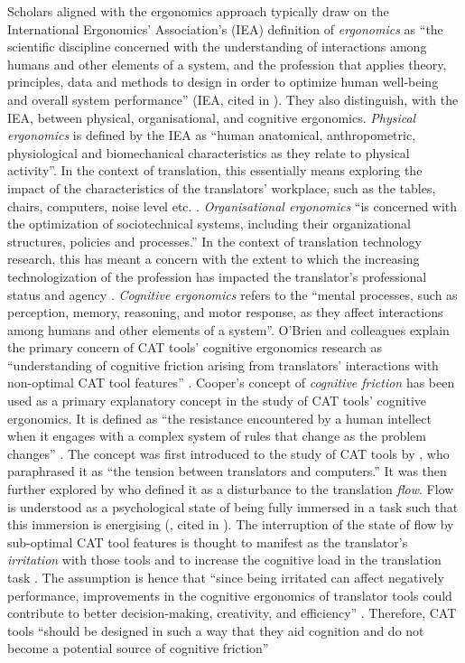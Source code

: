 Scholars aligned with the ergonomics approach typically draw on the International Ergonomics’ Association’s (IEA) definition of \textit{ergonomics} as ``the scientific discipline concerned with the understanding of interactions among humans and other elements of a system, and the profession that applies theory, principles, data and methods to design in order to optimize human well-being and overall system performance'' (IEA, cited in \cite{ehrensberger2019ergonomics}). They also distinguish, with the IEA, between physical, organisational, and cognitive ergonomics. \textit{Physical ergonomics} is defined by the IEA as ``human anatomical, anthropometric, physiological and biomechanical characteristics as they relate to physical activity''. In the context of translation, this essentially means exploring the impact of the characteristics of the translators’ workplace, such as the tables, chairs, computers, noise level etc. \citep[38]{ehrensberger2019ergonomics}. \textit{Organisational ergonomics} ``is concerned with the optimization of sociotechnical systems, including their organizational structures, policies and processes.'' In the context of translation technology research, this has meant a concern with the extent to which the increasing technologization of the profession has impacted the translator’s professional status and agency \citep[39]{ehrensberger2019ergonomics}. \textit{Cognitive ergonomics} refers to the ``mental processes, such as perception, memory, reasoning, and motor response, as they affect interactions among humans and other elements of a system''. O’Brien and colleagues explain the primary concern of CAT tools’ cognitive ergonomics research as ``understanding of cognitive friction arising from translators’ interactions with non-optimal CAT tool features'' \citep[147]{o2017irritating}. Cooper’s concept of \textit{cognitive friction} \citep{cooper2004high} has been used as a primary explanatory concept in the study of CAT tools’ cognitive ergonomics. It is defined as ``the resistance encountered by a human intellect when it engages with a complex system of rules that change as the problem changes'' \citep[19]{cooper2004high}. The concept was first introduced to the study of CAT tools by \cite[110]{o2012translation}, who paraphrased it as ``the tension between translators and computers.'' It was then further explored by \citep[102]{ehrensberger2015ergonomics} who defined it as a disturbance to the translation \textit{flow}. Flow is understood as a psychological state of being fully immersed in a task such that this immersion is energising (\citealt{NakamuraCsikszentmihalyi2002}, cited in \cite{ehrensberger2015ergonomics}). The interruption of the state of flow by sub-optimal CAT tool features is thought to manifest as the translator’s \textit{irritation} with those tools and to increase the cognitive load in the translation task \citep[146]{o2017irritating}. The assumption is hence that ``since being irritated can affect negatively performance, improvements in the cognitive ergonomics of translator tools could contribute to better decision-making, creativity, and efficiency'' \citep[43]{ehrensberger2019ergonomics}. Therefore, CAT tools ``should be designed in such a way that they aid cognition and do not become a potential source of cognitive friction'' 